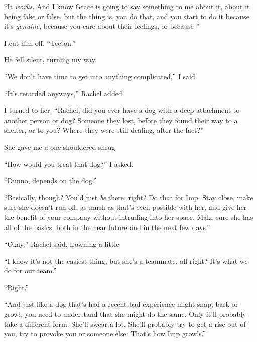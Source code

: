``It \emph{works.}  And I know Grace is going to say something to me about it, about it being fake or false, but the thing is, you do that, and you start to do it because it's \emph{genuine}, because you care about their feelings, or because-''



I cut him off.  ``Tecton.''



He fell silent, turning my way.



``We don't have time to get into anything complicated,'' I said.



``It's retarded anyways,'' Rachel added.



I turned to her.  ``Rachel, did you ever have a dog with a deep attachment to another person or dog?  Someone they lost, before they found their way to a shelter, or to you?  Where they were still dealing, after the fact?''



She gave me a one-shouldered shrug.



``How would you treat that dog?''  I asked.



``Dunno, depends on the dog.''



``Basically, though?  You'd just \emph{be} there, right?  Do that for Imp.  Stay close, make sure she doesn't run off, as much as that's even possible with her, and give her the benefit of your company without intruding into her space.  Make sure she has all of the basics, both in the near future and in the next few days.''



``Okay,'' Rachel said, frowning a little.



``I know it's not the easiest thing, but she's a teammate, all right?  It's what we do for our team.''



``Right.''



``And just like a dog that's had a recent bad experience might snap, bark or growl, you need to understand that she might do the same.  Only it'll probably take a different form.  She'll swear a lot.  She'll probably try to get a rise out of you, try to provoke you or someone else.  That's how Imp growls.''



